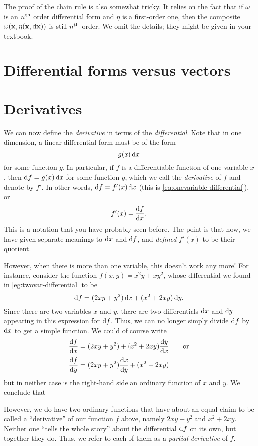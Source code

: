 \documentclass[12pt]{amsart}
\begin{document}
The proof of the chain rule is also somewhat tricky.
It relies on the fact that if $\omega$ is an $n^{\mathrm{th}}$ order differential form and $\eta$ is a first-order one, then the composite $\omega(\mathbf{x},\eta(\mathbf{x},\mathrm{d} \mathbf{x}))$ is still $n^{\mathrm{th}}$ order.
We omit the details; they might be given in your textbook.


\section{Differential forms versus vectors}
\label{sec:forms-vs-vectors}


\section{Derivatives}
\label{sec:derivatives}

We can now define the \emph{derivative} in terms of the \emph{differential}.
Note that in one dimension, a linear differential form must be of the form
\[ g(x) \,\mathrm{d} x \]
for some function $g$.
In particular, if $f$ is a differentiable function of one variable $x$, then $\mathrm{d} f = g(x) \, \mathrm{d} x$ for some function $g$, which we call the \emph{derivative} of $f$ and denote by $f'$.
In other words, $\mathrm{d} f = f'(x)\,\mathrm{d} x$ (this is \cref{eq:onevariable-differential}), or
\[ f'(x) = \frac{\mathrm{d} f}{\mathrm{d} x}. \]
This is a notation that you have probably seen before.
The point is that now, we have given separate meanings to $\mathrm{d} x$ and $\mathrm{d} f$, and \emph{defined} $f'(x)$ to be their quotient.

However, when there is more than one variable, this doesn't work any more!
For instance, consider the function $f(x,y) = x^2y + xy^2$, whose differential we found in \cref{eg:twovar-differential} to be
\[ \mathrm{d} f = (2xy + y^2)\,\mathrm{d} x + (x^2+2xy)\,\mathrm{d} y.\]
Since there are two variables $x$ and $y$, there are two differentials $\mathrm{d} x$ and $\mathrm{d} y$ appearing in this expression for $\mathrm{d} f$.
Thus, we can no longer simply divide $\mathrm{d} f$ by $\mathrm{d} x$ to get a simple function.
We could of course write
\begin{align*}
  \frac{\mathrm{d} f}{\mathrm{d} x} &= (2xy + y^2) + (x^2+2xy)\frac{\mathrm{d} y}{\mathrm{d} x} \qquad\text{or}\\[2pt]
  \frac{\mathrm{d} f}{\mathrm{d} y} &= (2xy + y^2)\frac{\mathrm{d} x}{\mathrm{d} y} + (x^2+2xy)
\end{align*}
but in neither case is the right-hand side an ordinary function of $x$ and $y$.
We conclude that\\
\begin{center}
\end{center}
\vspace{5mm}
However, we do have two ordinary functions that have about an equal claim to be called a ``derivative'' of our function $f$ above, namely $2xy + y^2$ and $x^2+2xy$.
Neither one ``tells the whole story'' about the differential $\mathrm{d} f$ on its own, but together they do.
Thus, we refer to each of them as a \emph{partial derivative} of $f$.
\end{document}
